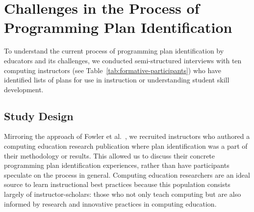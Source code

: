 


\section{Challenges in the Process of Programming Plan Identification}
\label{sec:interview_results}
To understand the current process of programming plan identification by educators and its challenges, we conducted semi-structured interviews with ten computing instructors (see Table~\ref{tab:formative-participants}) who have identified lists of plans for use in instruction or understanding student skill development. 

\subsection{Study Design}
Mirroring the approach of Fowler et al.~\cite{craig_max_methoda}, we recruited instructors who authored a computing education research publication where plan identification was a part of their methodology or results. This allowed us to discuss their concrete programming plan identification experiences, rather than have participants speculate on the process in general. Computing education researchers are an ideal source to learn instructional best practices because this population consists largely of instructor-scholars: those who not only teach computing but are also informed by research and innovative practices in computing education. 







